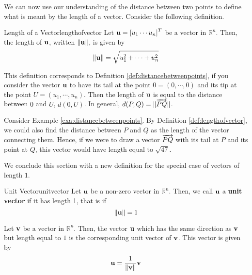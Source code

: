 We can now use our understanding of the distance between two points to define what is meant by the length of a 
vector. Consider the following definition.  

\begin{definition}{Length of a Vector}{lengthofvector}
Let ${\bf u} = \left[ u_{1} \cdots u_{n} \right]^T$ be a vector in
$\mathbb{R}^n$. Then, the length of ${\bf u}$, written $\| {\bf u} \|$, is given by
\begin{equation*}
\|
{\bf u}
\|
= \sqrt{ u_{1}^2 + \cdots + u_{n}^2}
\end{equation*}
\end{definition}

This definition corresponds to Definition
\ref{def:distancebetweenpoints}, if you consider the vector ${\bf u}$
to have its tail at the point $0 = \left( 0, \cdots ,0 \right)$ and its
tip at the point $U = \left(u_1, \cdots, u_n \right)$.  Then the length of
${\bf u}$ is equal to the distance between $0$ and $U$, $d(0,U)$. In general, $d(P,Q) = \| \overrightarrow{PQ} \|$. 

Consider Example \ref{exa:distancebetweenpoints}. By Definition \ref{def:lengthofvector}, we could also find the distance between $P$ and $Q$ 
as the length of the vector connecting them. Hence, if we were to draw a vector $\overrightarrow{PQ}$ 
with its tail at $P$ and its point at $Q$, this vector would have length equal to 
$\sqrt{47}$.

We conclude this section with a new definition for the special case of
vectors of length $1$.

\begin{definition}{Unit Vector}{unitvector}
Let ${\bf u}$ be a non-zero vector in $\mathbb{R}^{n}$. Then, we call ${\bf u}$ a 
\textbf{unit vector} if it has length 1, that is if
\begin{equation*}
\| {\bf u} \|
=
1
\end{equation*}
\end{definition}

Let ${\bf v}$ be a vector in $\mathbb{R}^{n}$. Then, the vector ${\bf u}$
which has the same direction as ${\bf v}$ but length equal to $1$ is the corresponding unit vector of ${\bf v}$. 
This vector is given by
\begin{equation*}
{\bf u}
=
\frac{1}{\| {\bf v} \|}
{\bf v}
\end{equation*}

